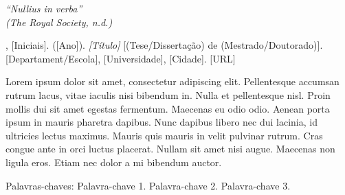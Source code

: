 
\begin{epigrafe}
  \vspace*{\fill}
	\begin{flushright}
	  \textit{
		  ``Nullius in verba''\\ (The Royal Society, n.d.)
		}
	\end{flushright}
\end{epigrafe}


\setlength{\absparsep}{18pt}
\begin{resumo}

\begin{flushleft}
[Sobrenome], [Iniciais]. ([Ano]). \textit{[Título]} [(Tese/Dissertação) de (Mestrado/Doutorado)]. [Departament/Escola], [Universidade], [Cidade]. [URL]
\end{flushleft}

Lorem ipsum dolor sit amet, consectetur adipiscing elit. Pellentesque accumsan rutrum lacus, vitae iaculis nisi bibendum in. Nulla et pellentesque nisl. Proin mollis dui sit amet egestas fermentum. Maecenas eu odio odio. Aenean porta ipsum in mauris pharetra dapibus. Nunc dapibus libero nec dui lacinia, id ultricies lectus maximus. Mauris quis mauris in velit pulvinar rutrum. Cras congue ante in orci luctus placerat. Nullam sit amet nisi augue. Maecenas non ligula eros. Etiam nec dolor a mi bibendum auctor.

Palavras-chaves: Palavra-chave 1. Palavra-chave 2. Palavra-chave 3.
\end{resumo}


